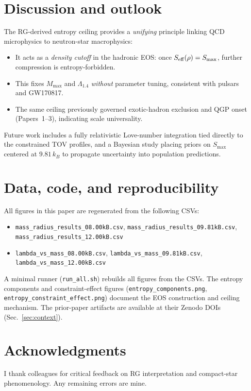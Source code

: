 \documentclass[11pt]{article}
\begin{document}
\section{Discussion and outlook}
\label{sec:discussion}
The RG-derived entropy ceiling provides a \emph{unifying} principle linking QCD microphysics to neutron-star macrophysics:
\begin{itemize}[leftmargin=1.2em]
\item It acts as a \emph{density cutoff} in the hadronic EOS: once $S_{\rm eff}(\rho)=S_{\max}$, further compression is entropy-forbidden. 
\item This fixes $M_{\max}$ and $\Lambda_{1.4}$ \emph{without} parameter tuning, consistent with pulsars and GW170817.
\item The same ceiling previously governed exotic-hadron exclusion and QGP onset (Papers~1--3), indicating scale universality.
\end{itemize}
Future work includes a fully relativistic Love-number integration tied directly to the constrained TOV profiles, and a Bayesian study placing priors on $S_{\max}$ centered at $9.81\,k_B$ to propagate uncertainty into population predictions.

\section*{Data, code, and reproducibility}
\noindent
All figures in this paper are regenerated from the following CSVs:
\begin{itemize}[leftmargin=1.2em]
\item \texttt{mass\_radius\_results\_08.00kB.csv}, 
\texttt{mass\_radius\_results\_09.81kB.csv}, 
\texttt{mass\_radius\_results\_12.00kB.csv}
\item \texttt{lambda\_vs\_mass\_08.00kB.csv}, 
\texttt{lambda\_vs\_mass\_09.81kB.csv}, 
\texttt{lambda\_vs\_mass\_12.00kB.csv}
\end{itemize}
A minimal runner (\texttt{run\_all.sh}) rebuilds all figures from the CSVs. The entropy components and constraint-effect figures (\texttt{entropy\_components.png}, \texttt{entropy\_constraint\_effect.png}) document the EOS construction and ceiling mechanism. The prior-paper artifacts are available at their Zenodo DOIs (Sec.~\ref{sec:context}).

\section*{Acknowledgments}
I thank colleagues for critical feedback on RG interpretation and compact-star phenomenology. Any remaining errors are mine.
\end{document}
